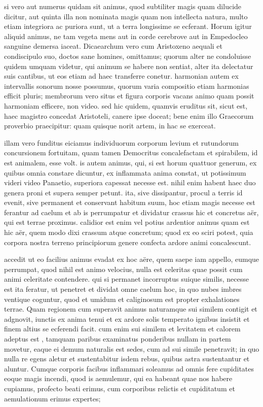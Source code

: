  si vero aut numerus quidam sit animus, quod subtiliter magis quam dilucide dicitur, aut quinta illa non nominata magis quam non intellecta natura, multo etiam integriora ac puriora sunt, ut a terra longissime se ecferant. Horum igitur aliquid animus, ne tam vegeta mens aut in corde cerebrove aut in Empedocleo sanguine demersa iaceat. Dicaearchum vero cum Aristoxeno aequali et condiscipulo suo, doctos sane homines, omittamus; quorum alter ne condoluisse quidem umquam videtur, qui animum se habere non sentiat, alter ita delectatur suis cantibus, ut eos etiam ad haec transferre conetur. harmonian autem ex intervallis sonorum nosse possumus, quorum varia compositio etiam harmonias efficit pluris; membrorum vero situs et figura corporis vacans animo quam possit harmoniam efficere, non video. sed hic quidem, quamvis eruditus sit, sicut est, haec magistro concedat Aristoteli, canere ipse doceat; bene enim illo Graecorum proverbio praecipitur: quam quisque norit artem, in hac se exerceat.

 illam vero funditus eiciamus individuorum corporum levium et rutundorum concursionem fortuitam, quam tamen Democritus concalefactam et spirabilem, id est animalem, esse volt. is autem animus, qui, si est horum quattuor generum, ex quibus omnia constare dicuntur, ex inflammata anima constat, ut potissimum videri video Panaetio, superiora capessat necesse est. nihil enim habent haec duo genera proni et supera semper petunt. ita, sive dissipantur, procul a terris id evenit, sive permanent et conservant habitum suum, hoc etiam magis necesse est ferantur ad caelum et ab is perrumpatur et dividatur crassus hic et concretus aër, qui est terrae proximus. calidior est enim vel potius ardentior animus quam est hic aër, quem modo dixi crassum atque concretum; quod ex eo sciri potest, quia corpora nostra terreno principiorum genere confecta ardore animi concalescunt.

 accedit ut eo facilius animus evadat ex hoc aëre, quem saepe iam appello, eumque perrumpat, quod nihil est animo velocius, nulla est celeritas quae possit cum animi celeritate contendere. qui si permanet incorruptus suique similis, necesse est ita feratur, ut penetret et dividat omne caelum hoc, in quo nubes imbres ventique coguntur, quod et umidum et caliginosum est propter exhalationes terrae. Quam regionem cum superavit animus naturamque sui similem contigit et adgnovit, iunctis ex anima tenui et ex ardore solis temperato ignibus insistit et finem altius se ecferendi facit. cum enim sui similem et levitatem et calorem adeptus est , tamquam paribus examinatus ponderibus nullam in partem movetur, eaque ei demum naturalis est sedes, cum ad sui simile penetravit; in quo nulla re egens aletur et sustentabitur isdem rebus, quibus astra sustentantur et aluntur. Cumque corporis facibus inflammari soleamus ad omnis fere cupiditates eoque magis incendi, quod is aemulemur, qui ea habeant quae nos habere cupiamus, profecto beati erimus, cum corporibus relictis et cupiditatum et aemulationum erimus expertes;

